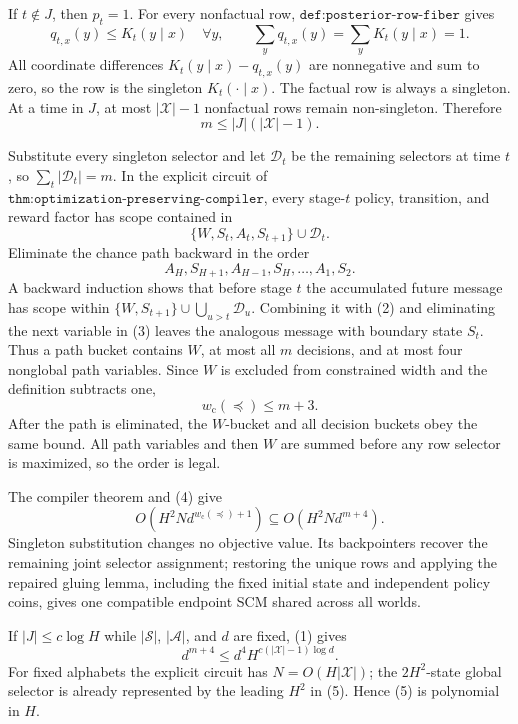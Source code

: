 If \(t\notin J\), then \(p_t=1\).  For every nonfactual row, \(\texttt{def:posterior-row-fiber}\) gives
\[
 q_{t,x}(y)\le K_t(y\mid x)\quad\forall y,
 \qquad \sum_yq_{t,x}(y)=\sum_yK_t(y\mid x)=1.
\]
All coordinate differences \(K_t(y\mid x)-q_{t,x}(y)\) are nonnegative and sum to zero, so the row is the singleton \(K_t(\cdot\mid x)\).  The factual row is always a singleton.  At a time in \(J\), at most \(|\mathcal X|-1\) nonfactual rows remain non-singleton.  Therefore
\[
 m\le |J|(|\mathcal X|-1). \tag{1}
\]

Substitute every singleton selector and let \(\mathcal D_t\) be the remaining selectors at time \(t\), so \(\sum_t|\mathcal D_t|=m\).  In the explicit circuit of \(\texttt{thm:optimization-preserving-compiler}\), every stage-\(t\) policy, transition, and reward factor has scope contained in
\[
 \{W,S_t,A_t,S_{t+1}\}\cup\mathcal D_t. \tag{2}
\]
Eliminate the chance path backward in the order
\[
 A_H,S_{H+1},A_{H-1},S_H,\ldots,A_1,S_2. \tag{3}
\]
A backward induction shows that before stage \(t\) the accumulated future message has scope within \(\{W,S_{t+1}\}\cup\bigcup_{u>t}\mathcal D_u\).  Combining it with (2) and eliminating the next variable in (3) leaves the analogous message with boundary state \(S_t\).  Thus a path bucket contains \(W\), at most all \(m\) decisions, and at most four nonglobal path variables.  Since \(W\) is excluded from constrained width and the definition subtracts one,
\[
 w_{\mathrm c}(\preceq)\le m+3. \tag{4}
\]
After the path is eliminated, the \(W\)-bucket and all decision buckets obey the same bound.  All path variables and then \(W\) are summed before any row selector is maximized, so the order is legal.

The compiler theorem and (4) give
\[
 O\!\left(H^2N d^{w_{\mathrm c}(\preceq)+1}\right)
 \subseteq O\!\left(H^2N d^{m+4}\right). \tag{5}
\]
Singleton substitution changes no objective value.  Its backpointers recover the remaining joint selector assignment; restoring the unique rows and applying the repaired gluing lemma, including the fixed initial state and independent policy coins, gives one compatible endpoint SCM shared across all worlds.

If \(|J|\le c\log H\) while \(|\mathcal S|\), \(|\mathcal A|\), and \(d\) are fixed, (1) gives
\[
 d^{m+4}\le d^4H^{c(|\mathcal X|-1)\log d}.
\]
For fixed alphabets the explicit circuit has \(N=O(H|\mathcal X|)\); the \(2H^2\)-state global selector is already represented by the leading \(H^2\) in (5).  Hence (5) is polynomial in \(H\).